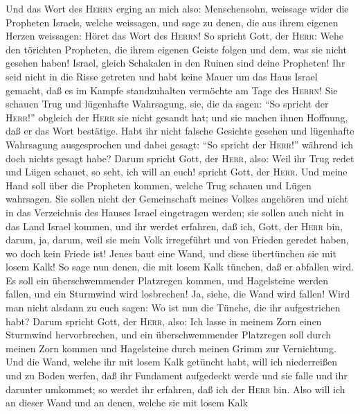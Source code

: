 Und das Wort des \textsc{Herrn} erging an mich also:
 Menschensohn, weissage wider die Propheten Israels,
welche weissagen, und sage zu denen, die aus ihrem eigenen Herzen
weissagen:  Höret das Wort des \textsc{Herrn}! So spricht
Gott, der \textsc{Herr}: Wehe den törichten Propheten, die ihrem eigenen
Geiste folgen und dem, was sie nicht gesehen haben! 
Israel, gleich Schakalen in den Ruinen sind deine Propheten!
 Ihr seid nicht in die Risse getreten und habt keine Mauer
um das Haus Israel gemacht, daß es im Kampfe standzuhalten vermöchte am
Tage des \textsc{Herrn}!  Sie schauen Trug und lügenhafte
Wahrsagung, sie, die da sagen: ``So spricht der \textsc{Herr}!''
obgleich der \textsc{Herr} sie nicht gesandt hat; und sie machen ihnen
Hoffnung, daß er das Wort bestätige.  Habt ihr nicht
falsche Gesichte gesehen und lügenhafte Wahrsagung ausgesprochen und
dabei gesagt: ``So spricht der \textsc{Herr}!'' während ich doch nichts
gesagt habe?  Darum spricht Gott, der \textsc{Herr}, also:
Weil ihr Trug redet und Lügen schauet, so seht, ich will an euch!
spricht Gott, der \textsc{Herr}.  Und meine Hand soll über
die Propheten kommen, welche Trug schauen und Lügen wahrsagen. Sie
sollen nicht der Gemeinschaft meines Volkes angehören und nicht in das
Verzeichnis des Hauses Israel eingetragen werden; sie sollen auch nicht
in das Land Israel kommen, und ihr werdet erfahren, daß ich, Gott, der
\textsc{Herr} bin,  darum, ja, darum, weil sie mein Volk
irregeführt und von Frieden geredet haben, wo doch kein Friede ist!
Jenes baut eine Wand, und diese übertünchen sie mit losem Kalk!
 So sage nun denen, die mit losem Kalk tünchen, daß er
abfallen wird. Es soll ein überschwemmender Platzregen kommen, und
Hagelsteine werden fallen, und ein Sturmwind wird losbrechen!
 Ja, siehe, die Wand wird fallen! Wird man nicht alsdann
zu euch sagen: Wo ist nun die Tünche, die ihr aufgestrichen habt?
 Darum spricht Gott, der \textsc{Herr}, also: Ich lasse
in meinem Zorn einen Sturmwind hervorbrechen, und ein überschwemmender
Platzregen soll durch meinen Zorn kommen und Hagelsteine durch meinen
Grimm zur Vernichtung.  Und die Wand, welche ihr mit
losem Kalk getüncht habt, will ich niederreißen und zu Boden werfen, daß
ihr Fundament aufgedeckt werde und sie falle und ihr darunter umkommet;
so werdet ihr erfahren, daß ich der \textsc{Herr} bin. 
Also will ich an dieser Wand und an denen, welche sie mit losem Kalk
